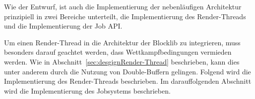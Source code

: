 Wie der Entwurf, ist auch die Implementierung der nebenläufigen Architektur prinzipiell in zwei Bereiche unterteilt, die Implementierung des Render-Threads und die Implementierung der Job API.

Um einen Render-Thread in die Architektur der Blocklib zu integrieren, muss besonders darauf geachtet werden, dass Wettkampfbedingungen vermieden werden. Wie in Abschnitt~\ref{sec:desgignRender-Thread} beschrieben, kann dies unter anderem durch die Nutzung von Double-Buffern gelingen. Folgend wird die Implementierung des Render-Threads beschrieben. Im darauffolgenden Abschnitt wird die Implementierung des Jobsystems beschrieben.